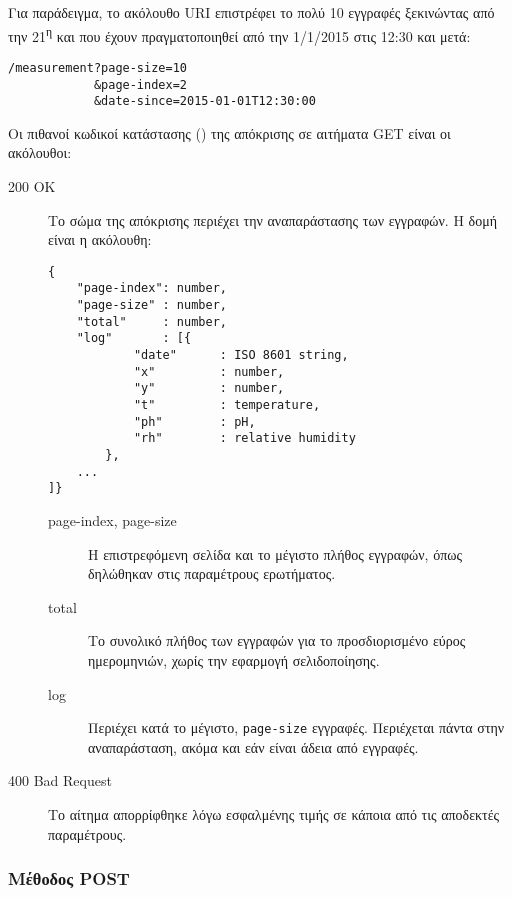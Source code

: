 Για παράδειγμα, το ακόλουθο URI επιστρέφει το πολύ 10 εγγραφές ξεκινώντας από
την 21\textsuperscript{η} και που έχουν πραγματοποιηθεί από την 1/1/2015 στις
12:30 και μετά:
\begin{lstlisting}
/measurement?page-size=10
            &page-index=2
            &date-since=2015-01-01T12:30:00
\end{lstlisting}

Οι πιθανοί κωδικοί κατάστασης () της απόκρισης σε αιτήματα GET
είναι οι ακόλουθοι:
\begin{description}
    \item[200 OK] Το σώμα της απόκρισης περιέχει την αναπαράστασης των εγγραφών.
    Η δομή είναι η ακόλουθη:
    \begin{lstlisting}
{
    "page-index": number,
    "page-size" : number,
    "total"     : number,
    "log"       : [{
            "date"      : ISO 8601 string,
            "x"         : number,
            "y"         : number,
            "t"         : temperature,
            "ph"        : pH,
            "rh"        : relative humidity
        },
    ...
]}
    \end{lstlisting}
    \begin{description}
        \item[page-index, page-size] Η επιστρεφόμενη σελίδα και το μέγιστο
        πλήθος εγγραφών, όπως δηλώθηκαν στις παραμέτρους ερωτήματος.

        \item[total] Το συνολικό πλήθος των εγγραφών για το προσδιορισμένο
        εύρος ημερομηνιών, χωρίς την εφαρμογή σελιδοποίησης.

        \item[log] Περιέχει κατά το μέγιστο, \verb~page-size~ εγγραφές.
        Περιέχεται πάντα στην αναπαράσταση, ακόμα και εάν είναι άδεια από
        εγγραφές.
    \end{description}

    \item[400 Bad Request] Το αίτημα απορρίφθηκε λόγω εσφαλμένης τιμής σε κάποια
    από τις αποδεκτές παραμέτρους.
\end{description}


\subsubsection{Μέθοδος POST}

